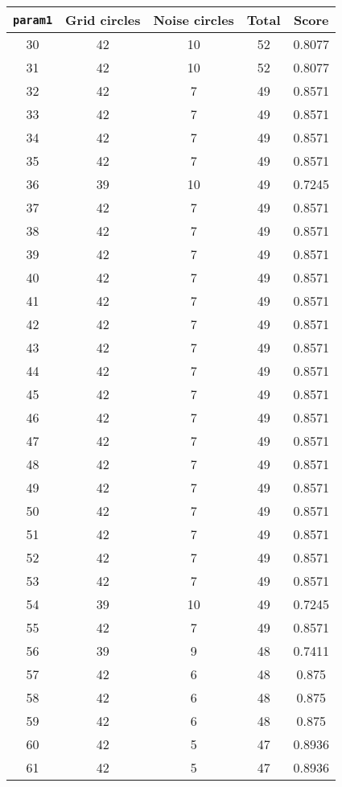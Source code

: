 \documentclass[letterpaper, 12pt]{article}
\begin{document}
\begin{longtable}{|c|c|c|c|c|}
\hline
\textbf{\texttt{param1}} & \textbf{Grid circles} & \textbf{Noise circles} & \textbf{Total} & \textbf{Score} \\
\hline
30 & 42 & 10 & 52 & 0.8077 \\
\hline
31 & 42 & 10 & 52 & 0.8077 \\
\hline
32 & 42 & 7 & 49 & 0.8571 \\
\hline
33 & 42 & 7 & 49 & 0.8571 \\
\hline
34 & 42 & 7 & 49 & 0.8571 \\
\hline
35 & 42 & 7 & 49 & 0.8571 \\
\hline
36 & 39 & 10 & 49 & 0.7245 \\
\hline
37 & 42 & 7 & 49 & 0.8571 \\
\hline
38 & 42 & 7 & 49 & 0.8571 \\
\hline
39 & 42 & 7 & 49 & 0.8571 \\
\hline
40 & 42 & 7 & 49 & 0.8571 \\
\hline
41 & 42 & 7 & 49 & 0.8571 \\
\hline
42 & 42 & 7 & 49 & 0.8571 \\
\hline
43 & 42 & 7 & 49 & 0.8571 \\
\hline
44 & 42 & 7 & 49 & 0.8571 \\
\hline
45 & 42 & 7 & 49 & 0.8571 \\
\hline
46 & 42 & 7 & 49 & 0.8571 \\
\hline
47 & 42 & 7 & 49 & 0.8571 \\
\hline
48 & 42 & 7 & 49 & 0.8571 \\
\hline
49 & 42 & 7 & 49 & 0.8571 \\
\hline
50 & 42 & 7 & 49 & 0.8571 \\
\hline
51 & 42 & 7 & 49 & 0.8571 \\
\hline
52 & 42 & 7 & 49 & 0.8571 \\
\hline
53 & 42 & 7 & 49 & 0.8571 \\
\hline
54 & 39 & 10 & 49 & 0.7245 \\
\hline
55 & 42 & 7 & 49 & 0.8571 \\
\hline
56 & 39 & 9 & 48 & 0.7411 \\
\hline
57 & 42 & 6 & 48 & 0.875 \\
\hline
58 & 42 & 6 & 48 & 0.875 \\
\hline
59 & 42 & 6 & 48 & 0.875 \\
\hline
60 & 42 & 5 & 47 & 0.8936 \\
\hline
61 & 42 & 5 & 47 & 0.8936 \\

\end{longtable}
\end{document}
